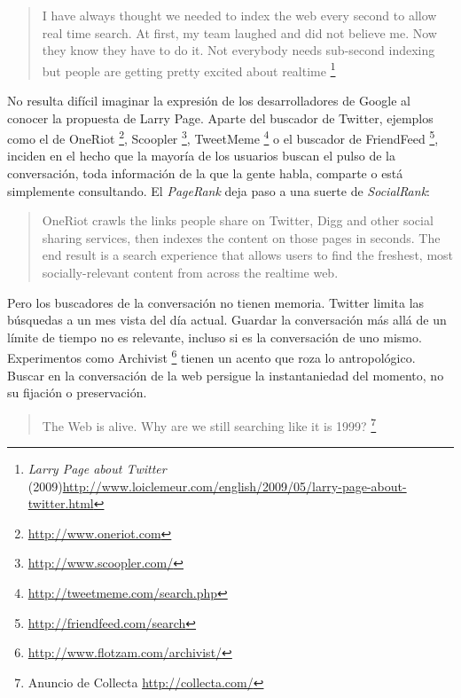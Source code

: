 \documentclass[12pt, a4paper,twoside]{book}
\begin{document}
\begin{quote}
I have always thought we needed to index the web every second to
allow real time search. At first, my team laughed and did not
believe me. Now they know they have to do it. Not everybody needs
sub-second indexing but people are getting pretty excited about
realtime%
\footnote{\emph{Larry Page about Twitter}
(2009)\href{http://www.loiclemeur.com/english/2009/05/larry-page-about-twitter.html}{http://www.loiclemeur.com/english/2009/05/larry-page-about-twitter.html}}

\end{quote}
No resulta difícil imaginar la expresión de los desarrolladores de
Google al conocer la propuesta de Larry Page. Aparte del buscador
de Twitter, ejemplos como el de OneRiot%
\footnote{\href{http://www.oneriot.com}{http://www.oneriot.com}},
Scoopler%
\footnote{\href{http://www.scoopler.com/}{http://www.scoopler.com/}},
TweetMeme%
\footnote{\href{http://tweetmeme.com/search.php}{http://tweetmeme.com/search.php}}
o el buscador de FriendFeed%
\footnote{\href{http://friendfeed.com/search}{http://friendfeed.com/search}},
inciden en el hecho que la mayoría de los usuarios buscan el pulso
de la conversación, toda información de la que la gente habla,
comparte o está simplemente consultando. El \emph{PageRank} deja
paso a una suerte de \emph{SocialRank}:

\begin{quote}
OneRiot crawls the links people share on Twitter, Digg and other
social sharing services, then indexes the content on those pages in
seconds. The end result is a search experience that allows users to
find the freshest, most socially-relevant content from across the
realtime web.

\end{quote}
Pero los buscadores de la conversación no tienen memoria. Twitter
limita las búsquedas a un mes vista del día actual. Guardar la
conversación más allá de un límite de tiempo no es relevante,
incluso si es la conversación de uno mismo. Experimentos como
Archivist%
\footnote{\href{http://www.flotzam.com/archivist/}{http://www.flotzam.com/archivist/}}
tienen un acento que roza lo antropológico. Buscar en la
conversación de la web persigue la instantaniedad del momento, no
su fijación o preservación.

\begin{quote}
The Web is alive. Why are we still searching like it is 1999?%
\footnote{Anuncio de Collecta
\href{http://collecta.com/}{http://collecta.com/}}

\end{quote}
\end{document}
